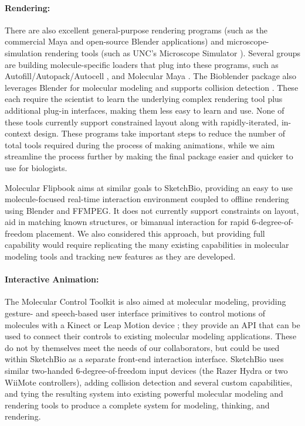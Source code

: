 \documentclass[twocolumn]{bmcart}%
\begin{document}
\paragraph*{Rendering:}
There are also excellent general-purpose rendering programs (such as the commercial Maya and open-source Blender applications) and microscope-simulation rendering tools (such as UNC's Microscope Simulator \cite{quammen2008}).
Several groups are building molecule-specific loaders that plug into these programs, such as Autofill/Autopack/Autocell \cite{Johnson2013}, and Molecular Maya \cite{molecularmaya}. The Bioblender package also leverages Blender for molecular modeling and supports collision detection \cite{zini2010bioblender}. These each require the scientist to learn the underlying complex rendering tool plus additional plug-in interfaces, making them less easy to learn and use. None of these tools currently support constrained layout along with rapidly-iterated, in-context design.
These programs take important steps to reduce the number of total tools required during the process of making animations, while we aim streamline the process further by making the final package easier and quicker to use for biologists.

Molecular Flipbook \cite{flipbook2013} aims at similar goals to SketchBio, providing an easy to use molecule-focused real-time interaction environment coupled to offline rendering using Blender and FFMPEG.  It does not currently support constraints on layout, aid in matching known structures, or bimanual interaction for rapid 6-degree-of-freedom placement.
We also considered this approach, but providing full capability would require replicating the many existing capabilities in molecular modeling tools and tracking new features as they are developed.

\paragraph*{Interactive Animation:}
The Molecular Control Toolkit \cite{sabirmolecular} is also aimed at molecular modeling, providing gesture- and speech-based user interface primitives to control motions of molecules with a Kinect or Leap Motion device \cite{sabirmolecular}; they provide an API that can be used to connect their controls to existing molecular modeling applications.  These do not by themselves meet the needs of our collaborators, but could be used within SketchBio as a separate front-end interaction interface.
SketchBio uses similar two-handed 6-degree-of-freedom input devices (the Razer Hydra or two WiiMote controllers), adding collision detection and several custom capabilities, and tying the resulting system into existing powerful molecular modeling and rendering tools to produce a complete system for modeling, thinking, and rendering.
\end{document}
